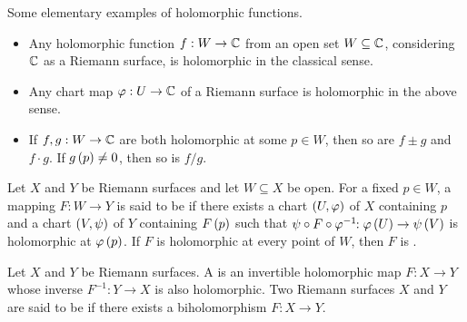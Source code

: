 \documentclass[../Moduli_Spaces_of_Riemann_Surfaces.tex]{subfiles}
\begin{document}
    \begin{example}
        Some elementary examples of holomorphic functions.
        \begin{itemize}
            \item Any holomorphic function $f:W\to\mathbb{C}$ from an open set $W\subseteq\mathbb{C}$, considering $\mathbb{C}$ as a Riemann surface, is holomorphic in the classical sense.
            \item Any chart map $\varphi:U\to\mathbb{C}$ of a Riemann surface is holomorphic in the above sense.
            \item If $f,g:W\to\mathbb{C}$ are both holomorphic at some $p\in W$, then so are $f\pm g$ and $f\cdot g$. If $g\left(p\right)\neq0$, then so is $f/g$.\exqed
        \end{itemize}
    \end{example}
    \begin{definition}
        Let $X$ and $Y$ be Riemann surfaces and let $W\subseteq X$ be open. For a fixed $p\in W$, a mapping $F:W\to Y$ is said to be  if there exists a chart $\left(U,\varphi\right)$ of $X$ containing $p$ and a chart $\left(V,\psi\right)$ of $Y$ containing $F\left(p\right)$ such that $\psi\circ F\circ\varphi^{-1}\!\!:\varphi\left(U\right)\to\psi\left(V\right)$ is holomorphic at $\varphi\left(p\right)$. If $F$ is holomorphic at every point of $W$, then $F$ is .
    \end{definition}
    \begin{definition}\label{1.2:def:biholomorphic_Riemann_surfaces}
        Let $X$ and $Y$ be Riemann surfaces. A  is an invertible holomorphic map $F:X\to Y$ whose inverse $F^{-1}:Y\to X$ is also holomorphic. Two Riemann surfaces $X$ and $Y$ are said to be  if there exists a biholomorphism $F:X\to Y$.
    \end{definition}
\end{document}
